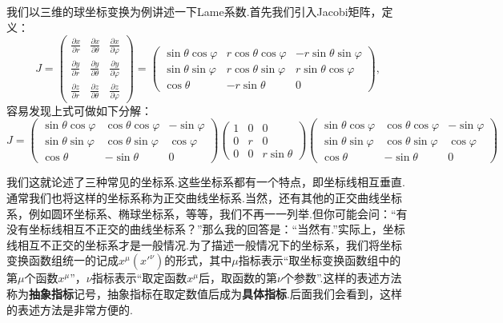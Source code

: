 		\begin{remark}
			我们以三维的球坐标变换为例讲述一下Lame系数.首先我们引入Jacobi矩阵，定义：
			\begin{equation}
				J=\begin{pmatrix}
					\frac{\partial x}{\partial r}&\frac{\partial x}{\partial \theta}&\frac{\partial x}{\partial \varphi}\\
					\frac{\partial y}{\partial r}&\frac{\partial y}{\partial \theta}&\frac{\partial y}{\partial \varphi}\\
					\frac{\partial z}{\partial r}&\frac{\partial z}{\partial \theta}&\frac{\partial z}{\partial \varphi}
				\end{pmatrix}
				=\begin{pmatrix}
					\sin\theta \cos\varphi&r\cos\theta\cos\varphi&-r\sin\theta\sin\varphi\\
					\sin\theta \sin\varphi&r\cos\theta\sin\varphi&r\sin\theta\cos\varphi\\
					\cos\theta&-r\sin\theta&0
				\end{pmatrix},
			\end{equation}
			容易发现上式可做如下分解：
			\begin{equation}
				J=\begin{pmatrix}
						\sin\theta\cos\varphi&\cos\theta\cos\varphi&-\sin\varphi\\
						\sin\theta\sin\varphi&\cos\theta\sin\varphi&\cos\varphi\\
						\cos\theta&-\sin\theta&0
					\end{pmatrix}
					\begin{pmatrix}
						1&0&0\\
						0&r&0\\
						0&0&r\sin\theta
					\end{pmatrix}
					\begin{pmatrix}
						\sin\theta\cos\varphi&\cos\theta\cos\varphi&-\sin\varphi\\
						\sin\theta\sin\varphi&\cos\theta\sin\varphi&\cos\varphi\\
						\cos\theta&-\sin\theta&0
					\end{pmatrix}
			\end{equation}

		\end{remark}
		我们这就论述了三种常见的坐标系.这些坐标系都有一个特点，即坐标线相互垂直.通常我们也将这样的坐标系称为正交曲线坐标系.当然，还有其他的正交曲线坐标系，例如圆环坐标系、椭球坐标系，等等，我们不再一一列举.但你可能会问：“有没有坐标线相互不正交的曲线坐标系？”那么我的回答是：“当然有.”实际上，坐标线相互不正交的坐标系才是一般情况.为了描述一般情况下的坐标系，我们将坐标变换函数组统一的记成$x^\mu(x'^\nu)$的形式，其中$\mu$指标表示“取坐标变换函数组中的第$\mu$个函数$x^\mu$”，$\nu$指标表示“取定函数$x^\mu$后，取函数的第$\nu$个参数”.这样的表述方法称为\textbf{抽象指标}记号，抽象指标在取定数值后成为\textbf{具体指标}.后面我们会看到，这样的表述方法是非常方便的.
